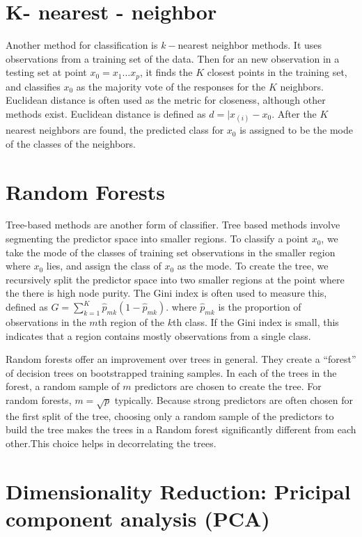 \documentclass[12pt,twoside]{reedthesis}
\theoremstyle{definition}
\theoremstyle{definition}
\theoremstyle{definition}
\theoremstyle{remark}
\begin{document}
\section{K- nearest - neighbor}\label{k--nearest---neighbor}

Another method for classification is \(k-\)nearest neighbor methods. It
uses observations from a training set of the data. Then for an new
observation in a testing set at point \(x_0 = x_1 \ldots x_p\), it finds
the \(K\) closest points in the training set, and classifies \(x_0\) as
the majority vote of the responses for the \(K\) neighbors. Euclidean
distance is often used as the metric for closeness, although other
methods exist. Euclidean distance is defined as \(d = |x_{(i)} - x_0\).
After the \(K\) nearest neighbors are found, the predicted class for
\(x_0\) is assigned to be the mode of the classes of the neighbors.

\section{Random Forests}\label{random-forests}

Tree-based methods are another form of classifier. Tree based methods
involve segmenting the predictor space into smaller regions. To classify
a point \(x_0\), we take the mode of the classes of training set
observations in the smaller region where \(x_0\) lies, and assign the
class of \(x_0\) as the mode. To create the tree, we recursively split
the predictor space into two smaller regions at the point where the
there is high node purity. The Gini index is often used to measure this,
defined as \(G = \sum_{k = 1}^K \hat{p}_{mk}(1 - \hat{p}_{mk})\). where
\(\hat{p}_{mk}\) is the proportion of observations in the \(m\)th region
of the \(k\)th class. If the Gini index is small, this indicates that a
region contains mostly observations from a single class.

Random forests offer an improvement over trees in general. They create a
``forest'' of decision trees on bootstrapped training samples. In each
of the trees in the forest, a random sample of \(m\) predictors are
chosen to create the tree. For random forests, \(m = \sqrt{p}\)
typically. Because strong predictors are often chosen for the first
split of the tree, choosing only a random sample of the predictors to
build the tree makes the trees in a Random forest significantly
different from each other.This choice helps in decorrelating the trees.

\section{Dimensionality Reduction: Pricipal component analysis
(PCA)}\label{dimensionality-reduction-pricipal-component-analysis-pca}
\end{document}
